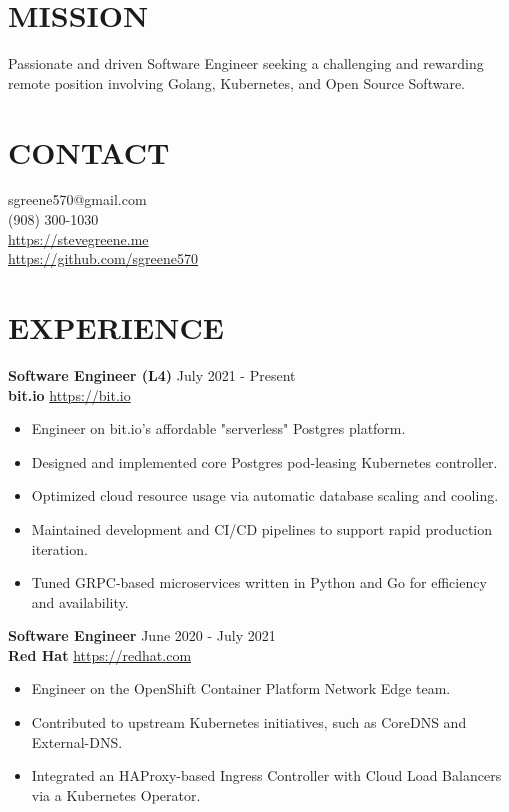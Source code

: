 \documentclass[line, margin, 10.5pt]{res}
\begin{document}

\begin{resume}

\section{\small MISSION}
Passionate and driven Software Engineer seeking a challenging and rewarding remote position involving Golang, Kubernetes, and Open Source Software.

\section{\small CONTACT}
sgreene570@gmail.com \\
(908) 300-1030 \\
\url{https://stevegreene.me} \\
\url{https://github.com/sgreene570}

\section{\small EXPERIENCE}
{\bf \large{Software Engineer (L4)}} \hfill July 2021 - Present \\
{\bf bit.io} \hfill \url{https://bit.io}
\begin{itemize}
    \item Engineer on bit.io's affordable "serverless" Postgres platform.
    \item Designed and implemented core Postgres pod-leasing Kubernetes controller.
    \item Optimized cloud resource usage via automatic database scaling and cooling.
    \item Maintained development and CI/CD pipelines to support rapid production iteration.
    \item Tuned GRPC-based microservices written in Python and Go for efficiency and availability.
\end{itemize}

{\bf \large{Software Engineer}} \hfill June 2020 - July 2021 \\
{\bf Red Hat} \hfill \url{https://redhat.com}
\begin{itemize}
    \item Engineer on the OpenShift Container Platform Network Edge team.
    \item Contributed to upstream Kubernetes initiatives, such as CoreDNS and External-DNS.
    \item Integrated an HAProxy-based Ingress Controller with Cloud Load Balancers via a Kubernetes Operator.
\end{itemize}


\end{resume}
\end{document}
